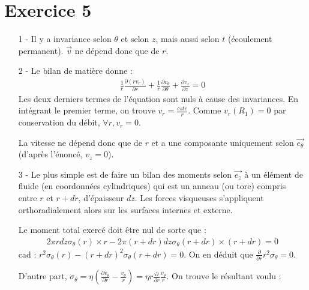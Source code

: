 \documentclass{report}
\begin{document}
\newpage

\section*{Exercice 5}

\begin{itemize}

\item[1 - ] Il y a invariance selon $\theta$ et selon $z$, mais aussi selon $t$ (écoulement permanent). $\vec{v}$ ne dépend donc que de $r$. 
\item[2 - ] Le bilan de matière donne : 
\begin{align*}
	\frac{1}{r}\frac{\partial(rv_r)}{\partial r} + \frac{1}{r}\frac{\partial v_\theta}{\partial \theta}+\frac{\partial v_z}{\partial z}=0
\end{align*}
Les deux derniers termes de l'équation sont nuls à cause des invariances. En intégrant le premier terme, on trouve $v_r=\frac{cste}{r}$. Comme $v_r(R_1)=0$ par conservation du débit, $\forall r, v_r=0$.

La vitesse ne dépend donc que de $r$ et a une composante uniquement selon $\vec{e_\theta}$ (d'après l'énoncé, $v_z=0$).

\item[3 - ] Le plus simple est de faire un bilan des moments selon $\vec{e_z}$ à un élément de fluide (en coordonnées cylindriques) qui est un anneau (ou tore) compris entre $r$ et $r+dr$, d'épaisseur $dz$. Les forces visqueuses s'appliquent orthoradialement alors sur les surfaces internes et externe. 

Le moment total exercé doit être nul de sorte que : 
\begin{align*}
	2\pi r dz \sigma_\theta(r)\times r - 2\pi (r+dr) dz \sigma_\theta(r+dr)\times (r+dr) = 0
\end{align*}
cad : $r^2 \sigma_\theta(r) - (r+dr)^2 \sigma_\theta(r+dr) = 0$. On en déduit que $\frac{\partial}{\partial r}r^2\sigma_\theta=0$.

D'autre part, $\sigma_\theta=\eta\left(\frac{\partial v_\theta}{\partial r}-\frac{v_\theta}{r}\right) =\eta r \frac{\partial}{\partial r}\frac{v_\theta}{r} $. On trouve le résultant voulu :

\noindent{}
	

\end{itemize}
\end{document}
